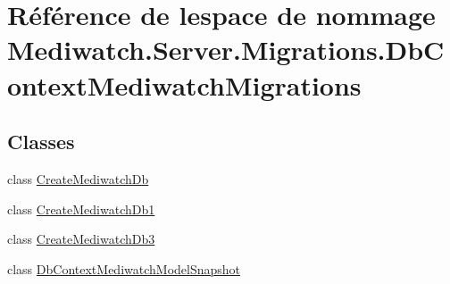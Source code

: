 \hypertarget{namespace_mediwatch_1_1_server_1_1_migrations_1_1_db_context_mediwatch_migrations}{}\section{Référence de l\textquotesingle{}espace de nommage Mediwatch.\+Server.\+Migrations.\+Db\+Context\+Mediwatch\+Migrations}
\label{namespace_mediwatch_1_1_server_1_1_migrations_1_1_db_context_mediwatch_migrations}
\subsection*{Classes}
\begin{DoxyCompactItemize}
\item 
class \hyperlink{class_mediwatch_1_1_server_1_1_migrations_1_1_db_context_mediwatch_migrations_1_1_create_mediwatch_db}{Create\+Mediwatch\+Db}
\item 
class \hyperlink{class_mediwatch_1_1_server_1_1_migrations_1_1_db_context_mediwatch_migrations_1_1_create_mediwatch_db1}{Create\+Mediwatch\+Db1}
\item 
class \hyperlink{class_mediwatch_1_1_server_1_1_migrations_1_1_db_context_mediwatch_migrations_1_1_create_mediwatch_db3}{Create\+Mediwatch\+Db3}
\item 
class \hyperlink{class_mediwatch_1_1_server_1_1_migrations_1_1_db_context_mediwatch_migrations_1_1_db_context_mediwatch_model_snapshot}{Db\+Context\+Mediwatch\+Model\+Snapshot}
\end{DoxyCompactItemize}
